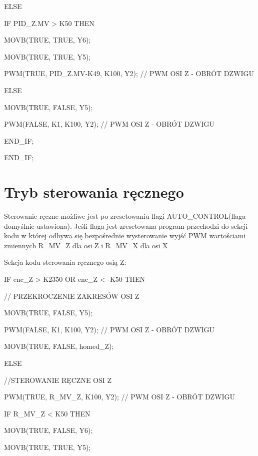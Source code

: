 \documentclass{mwrep}
\begin{document}
\quad \quad ELSE 

\quad \quad IF PID\_Z.MV > K50 THEN

\quad \quad \quad MOVB(TRUE, TRUE, Y6);

\quad \quad \quad MOVB(TRUE, TRUE, Y5);

\quad \quad \quad PWM(TRUE, PID\_Z.MV-K49, K100, Y2); // PWM OSI Z - OBRÓT DZWIGU		

\quad \quad \quad ELSE	

\quad \quad \quad MOVB(TRUE, FALSE, Y5);

\quad \quad \quad PWM(FALSE, K1, K100, Y2); // PWM OSI Z - OBRÓT DZWIGU	

\quad \quad END\_IF;

\quad END\_IF;




\section{Tryb sterowania ręcznego}
\label{PLC::Reka}

Sterowanie ręczne możliwe jest po zresetowaniu flagi AUTO\_CONTROL(flaga domyślnie ustawiona). Jeśli flaga jest zresetowana program przechodzi do sekcji kodu w której odbywa się bezpośrednie wysterowanie wyjść PWM wartościami zmiennych R\_MV\_Z dla osi Z i R\_MV\_X dla osi X

\vspace{1cm}

Sekcja kodu sterowania ręcznego osią Z:

\vspace{0.3cm}

\quad IF enc\_Z > K2350 OR enc\_Z < -K50 THEN

\quad \quad // PRZEKROCZENIE ZAKRESÓW OSI Z

\quad \quad MOVB(TRUE, FALSE, Y5);

\quad \quad PWM(FALSE, K1, K100, Y2); // PWM OSI Z - OBRÓT DZWIGU

\quad \quad MOVB(TRUE, FALSE, homed\_Z);

\quad \quad ELSE

\quad \quad //STEROWANIE RĘCZNE OSI Z

\quad \quad PWM(TRUE, R\_MV\_Z, K100, Y2);	// PWM OSI Z - OBRÓT DZWIGU

\quad \quad IF R\_MV\_Z < K50 THEN

\quad \quad \quad MOVB(TRUE, FALSE, Y6);

\quad \quad \quad MOVB(TRUE, TRUE, Y5);
\end{document}
